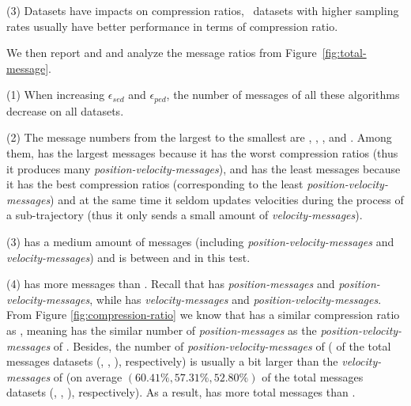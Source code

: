 {\ni (3) Datasets have impacts on compression ratios, \ie~datasets with higher sampling rates usually have better performance in terms of compression ratio.
	


 We then report and and analyze the message ratios from Figure~\ref{fig:total-message}.


\ni (1) When increasing $\epsilon_{sed}$ and $\epsilon_{ped}$, the number of messages of all these algorithms decrease on all datasets.

\ni (2) The message numbers from the largest to the smallest are \ldrh, \grts, \citt, \bitt and \sitt. Among them, \ldrh has the largest messages because it has the worst compression ratios (thus it produces many \emph{position-velocity-messages}), and \sitt has the least messages because it has the best compression ratios (corresponding to the least \emph{position-velocity-messages}) and at the same time it seldom updates velocities during the process of a sub-trajectory (thus it only sends a small amount of \emph{velocity-messages}).


\ni (3) \citt has a medium amount of messages (including \emph{position-velocity-messages} and \emph{velocity-messages}) and \bitt is between \citt and \sitt in this test.


\ni (4) \grts has more messages than \citt. Recall that \grts has \emph{position-messages} and \emph{position-velocity-messages}, while \citt has \emph{velocity-messages} and \emph{position-velocity-messages}. From Figure \ref{fig:compression-ratio} we know that \grts has a similar compression ratio as \citt, meaning \grts has the similar number of \emph{position-messages} as the \emph{position-velocity-messages} of \citt. Besides, the  number of \emph{position-velocity-messages} of \grts ( of the total messages \wrt datasets (\mopsi, \sercar, \geolife), respectively) is usually a bit larger than the \emph{velocity-messages} of \citt (on average $(60.41\%, 57.31\%, 52.80\%)$ of the total messages \wrt datasets (\mopsi, \sercar, \geolife), respectively). As a result, \grts has more total messages than \citt.

}
